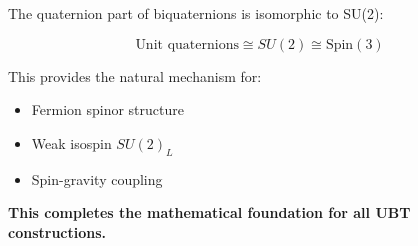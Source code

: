 The quaternion part of biquaternions is isomorphic to SU(2):

\begin{equation}
\text{Unit quaternions} \cong SU(2) \cong \text{Spin}(3)
\end{equation}

This provides the natural mechanism for:
\begin{itemize}
    \item Fermion spinor structure
    \item Weak isospin $SU(2)_L$
    \item Spin-gravity coupling
\end{itemize}

\textbf{This completes the mathematical foundation for all UBT constructions.}
